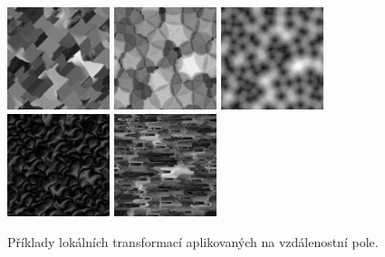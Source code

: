 \begin{figure}[htb]
\includegraphics[width=3cm,keepaspectratio]{obr/voro_09.jpg}
\includegraphics[width=3cm,keepaspectratio]{obr/voro_10.jpg}
\includegraphics[width=3cm,keepaspectratio]{obr/voro_11.jpg}
\includegraphics[width=3cm,keepaspectratio]{obr/voro_12.jpg}
\includegraphics[width=3cm,keepaspectratio]{obr/voro_13.jpg}
\caption{Příklady lokálních transformací aplikovaných na vzdálenostní pole.}
\label{fig:loctransform}
\end{figure}

